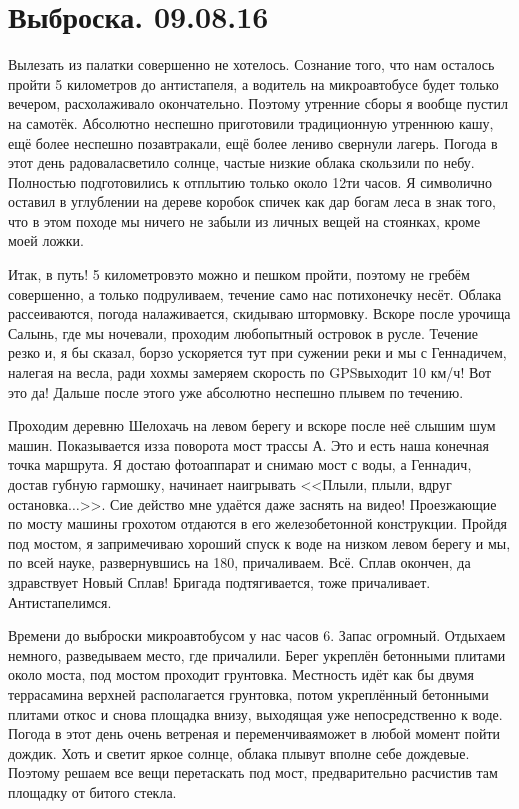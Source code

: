 \chapter{Выброска. 09.08.16} 

Вылезать из палатки совершенно не хотелось. Сознание того, что нам осталось пройти 5 километров до антистапеля, а водитель на микроавтобусе будет только вечером, расхолаживало окончательно. Поэтому утренние сборы я вообще пустил на самотёк. Абсолютно неспешно приготовили традиционную утреннюю кашу, ещё более неспешно позавтракали, ещё более лениво свернули лагерь. Погода в этот день радовала\mdash светило солнце, частые низкие облака скользили по небу. Полностью подготовились к отплытию только около 12\sdash ти часов. Я символично оставил в углублении на дереве коробок спичек как дар богам леса в знак того, что в этом походе мы ничего не забыли из личных вещей на стоянках, кроме моей ложки.

Итак, в путь! 5 километров\mdash это можно и пешком пройти, поэтому не гребём совершенно, а только подруливаем, течение само нас потихонечку несёт. Облака рассеиваются, погода налаживается, скидываю штормовку. Вскоре после урочища Салынь, где мы ночевали, проходим любопытный островок в русле. Течение резко и, я бы сказал, борзо ускоряется тут при сужении реки и мы с Геннадичем, налегая на весла, ради хохмы замеряем скорость по GPS\mdash выходит 10 км/ч! Вот это да! Дальше после этого уже абсолютно неспешно плывем по течению. 

Проходим деревню Шелохачь на левом берегу и вскоре после неё слышим шум машин. Показывается из\sdash за поворота мост трассы А. Это и есть наша конечная точка маршрута. Я достаю фотоаппарат и снимаю мост с воды, а Геннадич, достав губную гармошку, начинает наигрывать <<Плыли, плыли, вдруг остановка$\ldots$>>. Сие действо мне удаётся даже заснять на видео! Проезжающие по мосту машины грохотом отдаются в его железобетонной конструкции. Пройдя под мостом, я запримечиваю хороший спуск к воде на низком левом берегу и мы, по всей науке, развернувшись на 180, причаливаем. Всё. Сплав окончен, да здравствует Новый Сплав! Бригада подтягивается, тоже причаливает. Антистапелимся.

Времени до выброски микроавтобусом у нас часов 6. Запас огромный. Отдыхаем немного, разведываем место, где причалили. Берег укреплён бетонными плитами около моста, под мостом проходит грунтовка. Местность идёт как бы двумя террасами\mdash на верхней располагается грунтовка, потом укреплённый бетонными плитами откос и снова площадка внизу, выходящая уже непосредственно к воде. Погода в этот день очень ветреная  и переменчивая\mdash может в любой момент пойти дождик. Хоть и светит яркое солнце, облака плывут вполне себе дождевые. Поэтому решаем все вещи перетаскать под мост, предварительно расчистив там площадку от битого стекла. 

